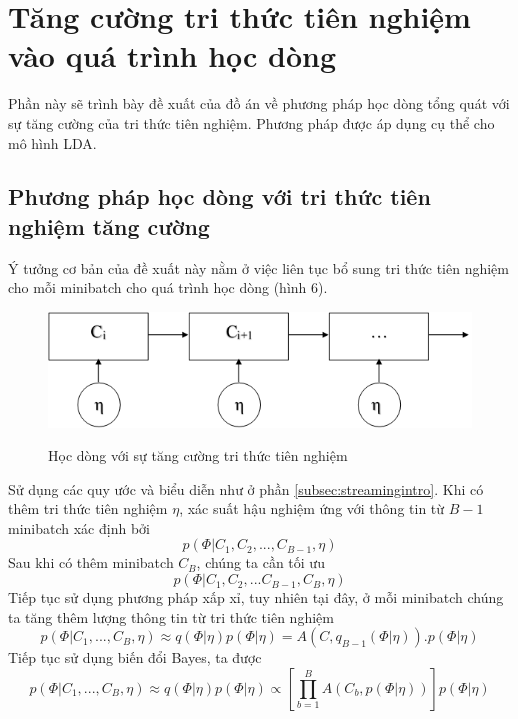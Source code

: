 \documentclass[fontsize=13pt]{scrartcl}
\begin{document}
\newpage
\section{Tăng cường tri thức tiên nghiệm vào quá trình học dòng}
Phần này sẽ trình bày đề xuất của đồ án về phương pháp học dòng tổng quát với sự tăng cường của tri thức tiên nghiệm. Phương pháp được áp dụng cụ thể cho mô hình LDA.
\subsection{Phương pháp học dòng với tri thức tiên nghiệm tăng cường}
Ý tưởng cơ bản của đề xuất này nằm ở việc liên tục bổ sung tri thức tiên nghiệm cho mỗi minibatch cho quá trình học dòng (hình 6).
\begin{figure}[h]
\begin{center}
\includegraphics[scale=.7]{img/streamingprior.png}
\label{fig:streamingprior}

\end{center}
\caption{Học dòng với sự tăng cường tri thức tiên nghiệm}

\end{figure}
Sử dụng các quy ước và biểu diễn như ở phần \ref{subsec:streamingintro}. Khi có thêm tri thức tiên nghiệm $\eta$, xác suất hậu nghiệm ứng với thông tin từ $B-1$ minibatch xác định bởi
\begin{equation}
p(\Phi | C_1, C_2, ...,C_{B-1},\eta)
\end{equation}
Sau khi có thêm minibatch $C_B$, chúng ta cần tối ưu
\begin{equation}
p(\Phi | C_1,C_2,...C_{B-1},C_{B},\eta)
\end{equation}
Tiếp tục sử dụng phương pháp xấp xỉ, tuy nhiên tại đây, ở mỗi minibatch chúng ta tăng thêm lượng thông tin từ tri thức tiên nghiệm
\begin{equation}
p(\Phi | C_1,...,C_B,\eta) \approx q(\Phi | \eta)p(\Phi | \eta) = A(C,q_{B-1}(\Phi | \eta)).p(\Phi | \eta)
\end{equation}
Tiếp tục sử dụng biến đổi Bayes, ta được
\begin{equation}\label{eq:newstreaminggupdate2}
p(\Phi | C_1,...,C_B,\eta) \approx q(\Phi | \eta) p(\Phi | \eta) \propto [\prod_{b=1}^{B} A(C_b,p(\Phi | \eta))] p(\Phi | \eta)
\end{equation}
\end{document}
